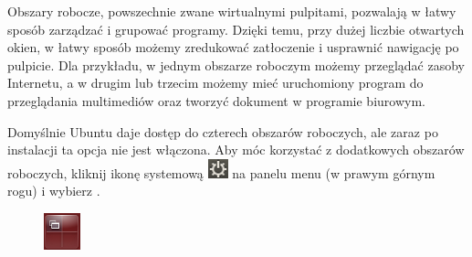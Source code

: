 Obszary robocze, powszechnie zwane wirtualnymi pulpitami, pozwalają w łatwy sposób zarządzać i grupować programy. Dzięki temu, przy dużej liczbie otwartych okien, w łatwy sposób możemy zredukować zatłoczenie i usprawnić nawigację po pulpicie. Dla przykładu, w jednym obszarze roboczym możemy przeglądać zasoby Internetu, a w drugim lub trzecim możemy mieć uruchomiony program do przeglądania multimediów oraz tworzyć dokument w programie biurowym.

Domyślnie Ubuntu daje dostęp do czterech obszarów roboczych, ale zaraz po instalacji ta opcja nie jest włączona. Aby móc korzystać z dodatkowych obszarów roboczych, kliknij ikonę systemową \includegraphics{images/ikony_zasilanie.png} na panelu menu (w prawym górnym rogu) i wybierz .

\begin{figure}
	\vspace{-10pt}
	\includegraphics[width=\linewidth]{images/ikony_obszary_robocze.png}
\end{figure}

